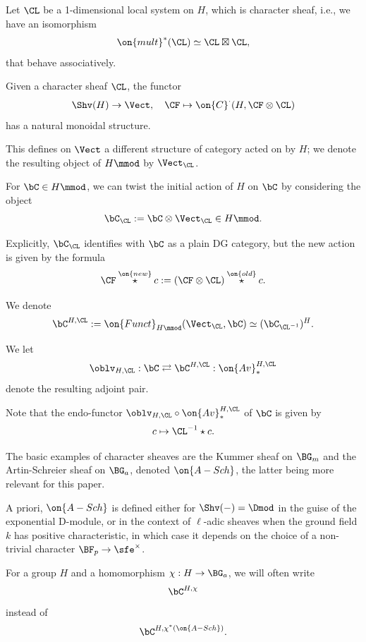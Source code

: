 \documentclass[9pt]{amsart}
\theoremstyle{definition}
\theoremstyle{remark}
\numberwithin{equation}{section}
\begin{document}


Let $\CL$ be a 1-dimensional local system on $H$, which is character sheaf, i.e., we have an isomorphism
$$\on{mult}^*(\CL)\simeq \CL\boxtimes \CL,$$
that behave associatively. 

\sssec{}

Given a character sheaf $\CL$, the functor
$$\Shv(H)\to \Vect, \quad \CF\mapsto \on{C}^\cdot(H,\CF\otimes \CL)$$
has a natural monoidal structure. 

\medskip

This defines on $\Vect$ a different structure
of category acted on by $H$; we denote the resulting object of $H\mmod$ by $\Vect_\CL$. 

\sssec{} 

For $\bC\in H\mmod$, we can twist the initial action of $H$ on $\bC$ by considering the object
$$\bC_\CL:=\bC\otimes \Vect_\CL\in H\mmod.$$ 

Explicitly, $\bC_\CL$ identifies with $\bC$ as a plain DG category, but the new action is given by
the formula
$$\CF\overset{\on{new}}\star c:= (\CF\otimes \CL) \overset{\on{old}}\star c.$$

\sssec{}  \label{sss:with coeff}

We denote
$$\bC^{H,\CL}:=\on{Funct}_{H\mmod}(\Vect_\CL,\bC)\simeq (\bC_{\CL^{-1}})^H.$$

We let
$$\oblv_{H,\CL}:\bC\rightleftarrows \bC^{H,\CL}:\on{Av}_*^{H,\CL}$$
denote the resulting adjoint pair.

\medskip

Note that the endo-functor $\oblv_{H,\CL}\circ \on{Av}_*^{H,\CL}$ of $\bC$ is 
given by
$$c\mapsto \CL^{-1}\star c.$$

\sssec{}

The basic examples of character sheaves are the Kummer sheaf on $\BG_m$ and the Artin-Schreier sheaf
on $\BG_a$, denoted $\on{A-Sch}$, the latter being more relevant for this paper.

\medskip

A priori, $\on{A-Sch}$ is defined either for $\Shv(-)=\Dmod$ in the guise of the exponential D-module,
or in the context of $\ell$-adic sheaves when the ground field $k$ has positive characteristic, in which
case it depends on the choice of a non-trivial character $\BF_p\to \sfe^\times$. 

\medskip

For a group $H$ and a homomorphism $\chi:H\to \BG_a$, we will often write 
$$\bC^{H,\chi}$$
instead of
$$\bC^{H,\chi^*(\on{A-Sch})}.$$
\end{document}
